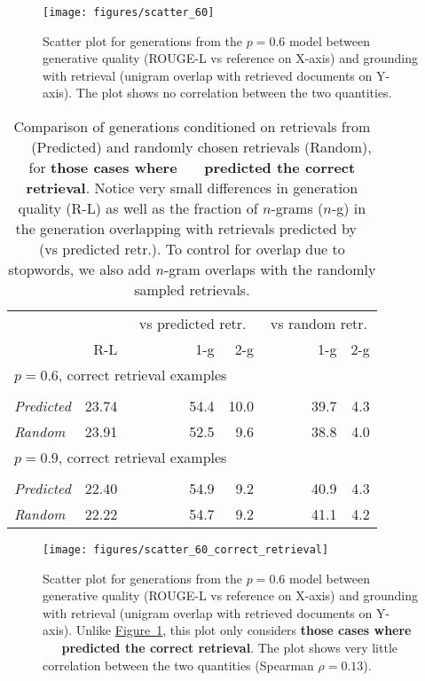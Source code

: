 \documentclass[11pt]{article}
\newcommand{\namedref}[2]{\hyperref[#2]{#1~\ref*{#2}}}
\newcommand{\figureref}[1]{\namedref{Figure}{#1}}
\newcommand{\retriever}[1]{\textsc{c-REALM}}
\begin{document}
\begin{figure}[t]
    \centering
    \texttt{[image: figures/scatter\_60]}

    \caption{Scatter plot for generations from the $p=0.6$ model between generative quality (ROUGE-L vs reference on X-axis) and grounding with retrieval (unigram overlap with retrieved documents on Y-axis). The plot shows no correlation between the two quantities.}
    \label{fig:scatter_60}
\end{figure}


\begin{table}[h]
\small
\begin{center}
\begin{tabular}{ lrrrrr } 
 \toprule
 & & \multicolumn{2}{c}{vs predicted retr.} & \multicolumn{2}{c}{vs random retr.} \\
 & R-L & ~~~~~~~~~1-g & 2-g & ~~~~~~~1-g & 2-g \\
\midrule
\multicolumn{6}{l}{$p = 0.6$, correct retrieval examples} \\\\
\emph{Predicted} & 23.74 & 54.4 & 10.0 & 39.7 & 4.3  \\
\emph{Random} & 23.91 & 52.5 & 9.6 & 38.8 & 4.0 \\
\midrule
\multicolumn{6}{l}{$p = 0.9$, correct retrieval examples} \\\\
\emph{Predicted}  & 22.40 & 54.9 & 9.2 & 40.9 & 4.3 \\
\emph{Random} & 22.22 & 54.7 & 9.2 & 41.1 & 4.2 \\
\bottomrule
\end{tabular}
\end{center}
\caption{Comparison of generations conditioned on retrievals from ~\retriever~ (Predicted) and randomly chosen retrievals (Random), for \textbf{those cases where ~\retriever~ predicted the correct retrieval}. Notice very small differences in generation quality (R-L) as well as the fraction of $n$-grams ($n$-g) in the generation overlapping with retrievals predicted by \retriever~ (vs predicted retr.). To control for overlap due to stopwords, we also add $n$-gram overlaps with the randomly sampled retrievals.}
\label{tab:pred_vs_random_correct_ret}
\end{table}

\begin{figure}[t]
    \centering
    \texttt{[image: figures/scatter\_60\_correct\_retrieval]}

    \caption{Scatter plot for generations from the $p=0.6$ model between generative quality (ROUGE-L vs reference on X-axis) and grounding with retrieval (unigram overlap with retrieved documents on Y-axis). Unlike \figureref{fig:scatter_60}, this plot only considers \textbf{those cases where ~\retriever~ predicted the correct retrieval}. The plot shows very little correlation between the two quantities (Spearman $\rho = 0.13$).}
    \label{fig:scatter_60_correct_retrieval}
\end{figure}
\end{document}
